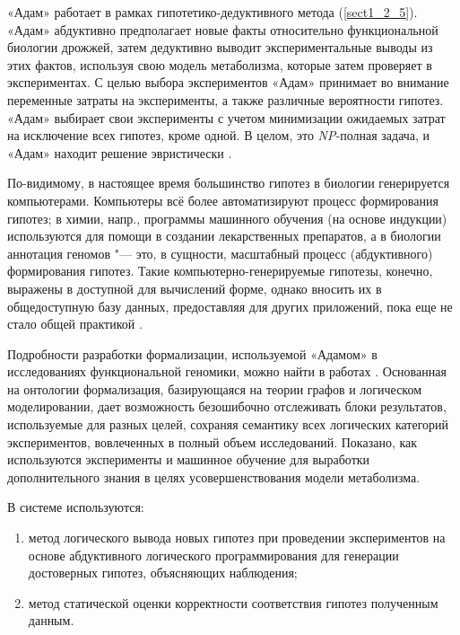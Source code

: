 «Адам» работает в рамках гипотетико-дедуктивного метода (\cref{sect1_2_5}). «Адам» абдуктивно предполагает новые факты 
относительно функциональной биологии дрожжей, затем дедуктивно выводит экспериментальные выводы из этих фактов, 
используя свою модель метаболизма, которые затем проверяет в экспериментах. С целью выбора экспериментов «Адам» 
принимает во внимание переменные затраты на эксперименты, а также различные вероятности гипотез. «Адам» выбирает 
свои эксперименты с учетом минимизации ожидаемых затрат на исключение всех гипотез, кроме одной. В целом, это 
\textit{NP}-полная задача, и «Адам» находит решение эвристически \cite{soldatova2011representation}.

По-видимому, в настоящее время большинство гипотез в биологии генерируется компьютерами. Компьютеры всё более 
автоматизируют процесс формирования гипотез; в химии, напр., программы машинного обучения (на основе индукции) 
используются для помощи в создании лекарственных препаратов, а в биологии аннотация геномов "--- это, в сущности, 
масштабный процесс (абдуктивного) формирования гипотез. Такие компьютерно-генерируемые гипотезы, конечно, выражены в 
доступной для вычислений форме, однако вносить их в общедоступную базу данных, предоставляя для других приложений, 
пока еще не стало общей практикой \cite{soldatova2011representation}.

Подробности разработки формализации, используемой «Адамом» в исследованиях функциональной геномики, можно найти в 
работах \cite{qi2010ontology,soldatova2011representation}. Основанная на онтологии формализация, базирующаяся на 
теории графов и логическом моделировании, дает возможность безошибочно отслеживать блоки результатов, используемые 
для разных целей, сохраняя семантику всех логических категорий экспериментов, вовлеченных в полный объем исследований. 
Показано, как используются эксперименты и машинное обучение для выработки дополнительного знания в целях 
усовершенствования модели метаболизма.

В системе используются: 

\begin{enumerate}
    \item метод логического вывода новых гипотез при проведении экспериментов на основе абдуктивного логического 
            программирования для генерации достоверных гипотез, объясняющих наблюдения;
    \item метод статической оценки корректности соответствия гипотез полученным данным.
\end{enumerate}

